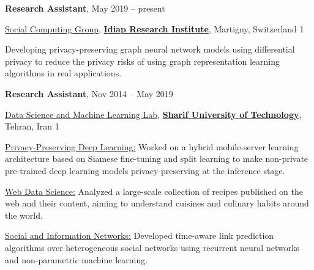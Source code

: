 \documentclass[8pt]{article}
\newcommand{\halfblankline}{\quad\vspace{-0.5\baselineskip}\pagebreak[3]}
\def\longversion{1}  %
\begin{document}
\textbf{Research Assistant}, {May 2019 -- present}
\begin{innerlist}
    \item[] \href{https://www.idiap.ch/en/scientific-research/social-computing/index_html}{Social Computing Group}, \textbf{\href{https://idiap.ch}{Idiap Research Institute}}, Martigny, Switzerland
    \if\longversion1
    \begin{innerlist}
    	\item Developing privacy-preserving graph neural network models using differential privacy to reduce the privacy risks of using graph representation learning algorithms in real applications.
    \end{innerlist}
  	\fi
\end{innerlist}



\halfblankline

\textbf{Research Assistant}, {Nov 2014 -- May 2019}
\begin{innerlist}
	\item[] \href{http://dml.ce.sharif.edu/}{Data Science and Machine Learning Lab}, \href{http://www.en.sharif.edu/}{\textbf{Sharif University of Technology}}, Tehran, Iran
	\if\longversion1
	\begin{innerlist}
		\item \underline{Privacy-Preserving Deep Learning:} Worked on a hybrid mobile-server learning architecture based on Siamese fine-tuning and split learning to make non-private pre-trained deep learning models privacy-preserving at the inference stage.
		\item \underline{Web Data Science:} Analyzed a large-scale collection of recipes published on the web and their content, aiming to understand cuisines and culinary habits around the world.
		\item \underline{Social and Information Networks:} Developed time-aware link prediction algorithms over heterogeneous social networks using recurrent neural networks and non-parametric machine learning.
	\end{innerlist}
	\fi
\end{innerlist}
\end{document}
